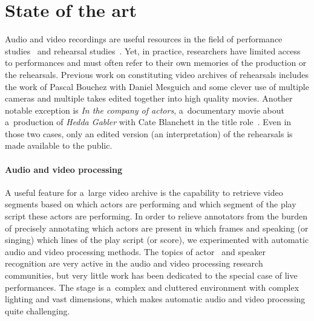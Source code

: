 \documentclass[conference]{IEEEtran}
\newcommand{\todo}[1]{\noindent\textcolor{red}{{\bf \{ToDo} #1{\bf \}}}}
\begin{document}


\section{State of the art}
\label{sec:stateoftheart}

Audio and video recordings are useful resources in the field of performance studies~\cite{mcauley1994video,Bravo07} and rehearsal studies~\cite{McAuley06,McAuley08}. Yet, in practice, researchers have limited access to performances and must often refer to their own memories of the production or the rehearsals. Previous work on constituting video archives of rehearsals includes the work of Pascal Bouchez with Daniel Mesguich\cite{Bouchez07} and some clever use of multiple cameras and multiple takes edited together into high quality movies. Another notable exception is {\em In the company of actors}, a~documentary movie about a~production of \emph{Hedda Gabler} with Cate Blanchett in the title role~\cite{Darling07}. Even in those two cases, only an edited version (an interpretation)  of the rehearsals is made available to the public.



\paragraph*{Audio and video processing}
A useful feature for a~large video archive is the capability to retrieve video segments based on which actors 
are performing and which segment of the play script these actors are performing. In order to relieve annotators from the burden of precisely annotating which actors are present in which frames and speaking (or singing) which lines of the play script (or score),  we experimented with automatic audio and video processing methods. The topics of actor~\cite{Hilton06} and speaker~\cite{Miro12} recognition are very active in the audio and video processing research communities, but very little work has been dedicated to the special case of live performances. The stage is a~complex and cluttered environment  with complex lighting and vast dimensions, which makes automatic audio and video processing quite challenging. 
\end{document}
